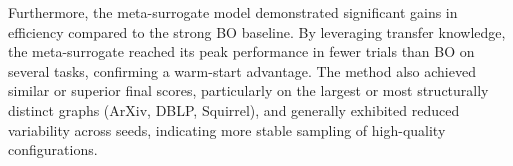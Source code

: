 {%
	Furthermore, the meta-surrogate model demonstrated significant gains in efficiency compared to the strong BO baseline. By leveraging transfer knowledge, the meta-surrogate reached its peak performance in fewer trials than BO on several tasks, confirming a warm-start advantage. The method also achieved similar or superior final scores, particularly on the largest or most structurally distinct graphs (ArXiv, DBLP, Squirrel), and generally exhibited reduced variability across seeds, indicating more stable sampling of high-quality configurations.
}

\onecolumn \maketitle \normalsize \setcounter{footnote}{0} \vfill
